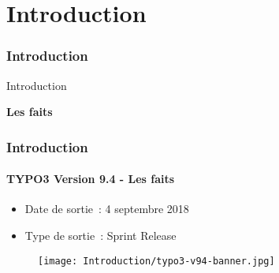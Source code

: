 %


\section{Introduction}
\begin{frame}[fragile]
	\frametitle{Introduction}

	\begin{center}\huge{Introduction}\end{center}
	\begin{center}\huge{\color{typo3darkgrey}\textbf{Les faits}}\end{center}

\end{frame}


\begin{frame}[fragile]
	\frametitle{Introduction}
	\framesubtitle{TYPO3 Version 9.4 - Les faits}

	\begin{itemize}
		\item Date de sortie~: 4 septembre 2018
		\item Type de sortie~: Sprint Release
	\end{itemize}

	\begin{figure}
		\texttt{[image: Introduction/typo3-v94-banner.jpg]}
	\end{figure}

\end{frame}


